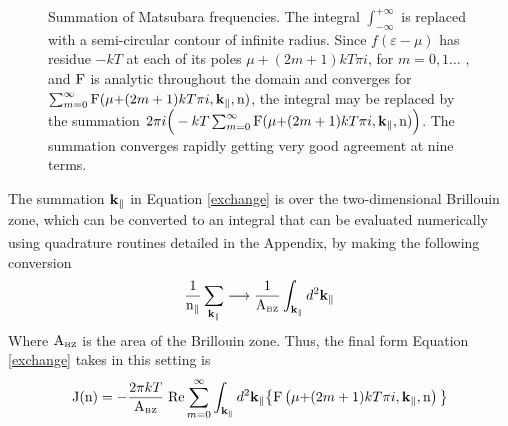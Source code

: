\documentclass[a4paper, 12pt]{article}
\begin{document}
\begin{figure}[H]
\caption{\footnotesize
	Summation of Matsubara frequencies. The integral $\int_{-\infty}^{+\infty}$ is replaced with a semi-circular contour of infinite radius. Since $f(\varepsilon - \mu)$ has residue $-kT$ at each of its poles $\mu + (2m+1)kT\pi i$, for $m=0,1\dots$ , and $\rm F$ is analytic throughout the domain and converges for $\sum_{m=0}^\infty {\rm F}(\mu{ + (2m+1)kT\pi i}, \rm\bf k_\parallel, \rm n)$, the integral may be replaced by the summation 
	$2\pi i\Big(-kT\sum_{m=0}^\infty {\rm F}(\mu{ + (2m+1)kT\pi i}, \rm\bf k_\parallel, \rm n)\Big)$. The summation converges rapidly getting very good agreement at nine terms.
	}\label{fig:4th}
	
\end{figure}
The summation $\rm\bf k_\parallel$ in Equation \eqref{exchange} is over the two-dimensional Brillouin zone, which can be converted to an integral that can be evaluated numerically using quadrature routines detailed in the Appendix\textcolor{blue}{\textsuperscript{\cite{CP}}}, by making the following conversion
\begin{equation}\label{sum}
	\frac{1}{\rm n_\parallel}\sum_{\bf k_\parallel} \longrightarrow \frac{1}{\rm A_{\scriptscriptstyle BZ}} \int_{\bf k_\parallel}d^2 \bf k_\parallel
\end{equation}	
Where $\rm A_{\scriptscriptstyle BZ}$ is the area of the Brillouin zone.
Thus, the final form Equation \eqref{exchange} takes in this setting is
\begin{equation}
	{\rm{J(n)}}=-\frac{2\pi kT}{\rm A_{\scriptscriptstyle BZ}} \; {\rm Re}\sum_{m=0}^\infty\int_{\rm\bf k_\parallel} d^2 {\rm\bf k_\parallel}\big\{ {\rm F}\left(\mu{ + (2m+1)kT\pi i}, \rm\bf k_\parallel, \rm n\right)\big\}
\end{equation}
\end{document}
